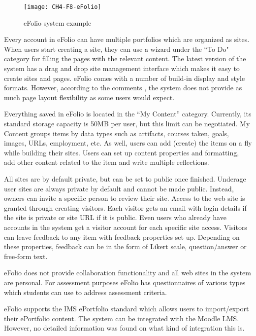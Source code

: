 \begin{figure}[htb]
\centering
\setlength\fboxsep{0pt}
\setlength\fboxrule{0.5pt}
\texttt{[image: CH4-F8-eFolio]}
\caption[eFolio system example]{eFolio system example \citep{EFolioMinnesota2011}}
\label{fig:efolio}
\end{figure}

Every account in eFolio can have multiple portfolios which are organized as
sites. When users start creating a site, they can use a wizard under the ``To
Do" category for filling the pages with the relevant content. The latest version
of the system has a drag and drop site management interface which makes it easy to
create sites and pages. eFolio comes with a number of build-in display and style
formats. However, according to the comments \citep{AAEEBL2011}, the system
does not provide as much page layout flexibility as some users would expect.

Everything saved in eFolio is located in the ``My Content'' category. Currently,
its standard storage capacity is 50MB per user, but this limit can be
negotiated. My Content groups items by data types such as artifacts, courses
taken, goals, images, URLs, employment, etc. As well, users can add (create) the
items on a fly while building their sites. Users can set up content properties
and formatting, add other content related to the item and write multiple
reflections.

All sites are by default private, but can be set to public once finished.
Underage user sites are always private by default and cannot be made public.
Instead, owners can invite a specific person to review their site. Access to the
web site is granted through creating visitors. Each visitor gets an email with
login details if the site is private or site URL if it is public. Even users who
already have accounts in the system get a visitor account for each specific site
access. Visitors can leave feedback to any item with feedback properties set up.
Depending on these properties, feedback can be in the form of Likert scale,
question/answer or free-form text.

eFolio does not provide collaboration functionality and all web sites in the
system are personal. For assessment purposes eFolio has questionnaires of
various types which students can use to address assessment criteria.

eFolio supports the IMS ePortfolio standard which allows users to import/export
their ePortfolio content. The system can be integrated with the Moodle LMS.
However, no detailed information was found on what kind of integration this is.


